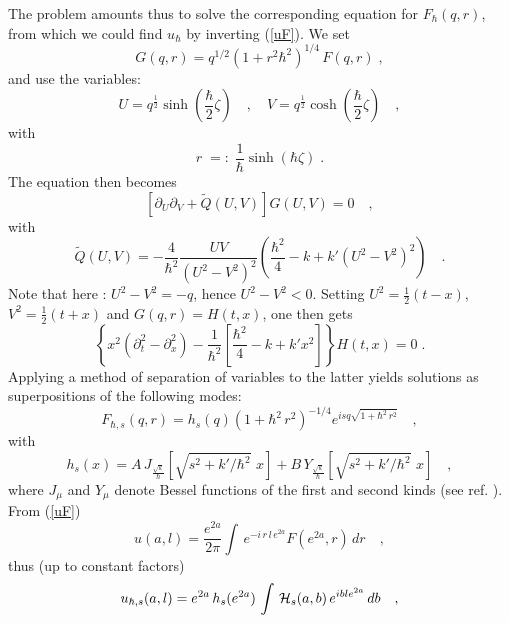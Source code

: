 \documentclass{article}
\def\m{\mu}
\begin{document}
\noindent The problem  amounts thus to solve the corresponding equation for $F_\hbar (q,
r)$, from which we could find $u_\hbar$ by
inverting (\ref{uF}). We set 
\begin{equation}
G(q,r)  = q^{1/2} (1+ r^2\hbar^2)^{1/4}\,F(q,r)\;,
\end{equation}
\noindent and use the variables:
\begin{equation}\label{UVqr}
U = q^{\frac{1}{2}}\sinh(\frac{\hbar}{2}\zeta) \quad, \quad V =
q^{\frac{1}{2}}\cosh(\frac{\hbar}{2}\zeta)  \quad,
\end{equation}
with
\begin{equation}\label{rzeta}
r\;=:\;\frac{1}{\hbar}\sinh(\hbar\zeta)\;.
\end{equation}
\noindent The equation then becomes
\begin{equation}\label{wave}
\left[\partial_U \partial_V + \tilde{Q}(U,V)\right] G(U,V) = 0
\quad,
\end{equation}
with
\begin{equation}
\tilde{Q}(U,V) = -\frac{4}{\hbar^2} \frac{UV}{(U^2 - V^2)^2}
(\frac{\hbar^2}{4} - k + k'(U^2 - V^2)^2) \quad.
\end{equation}
Note that here : $U^2 - V^2 = -q$, hence $U^2 - V^2<0$. Setting  $U^2=\frac{1}{2}(t-x)$,
$V^2=\frac{1}{2}(t+x)$ and $G(q,r)=H(t,x)$, one then gets
\begin{equation}
\left\{x^2(\partial^2_t-\partial^2_x)-\frac
1{\hbar^2}[\frac{\hbar^2}{4} -k+k'x^2]\right\}H(t,x)=0\;.
\end{equation}
Applying a method of separation of variables to the latter yields solutions  as  superpositions of 
the following modes:
\begin{equation}
F_{\hbar,s} (q,r) =  h_s(q) (1+\hbar^2
\, r^2)^{-1/4} e^{i s q\sqrt{1+\hbar^2\,r^2} }\quad,
\end{equation}
with
\begin{equation}\label{hs}
h_s(x)= A\, J_{\frac
{\sqrt{k}}{\hbar}}[\sqrt{s^2+ {k'} /{\hbar^2}}\,\,
x] + B\, Y_{\frac{\sqrt{k}}{\hbar}}[\sqrt{s^2+  {k'}/ {\hbar^2}}\,\, x]\quad,
\end{equation}
where $J_\m$ and $Y_\mu$ denote  Bessel functions of the first and second kinds (see ref. \cite{Wa}).
From (\ref{uF})
\begin{equation}\label{Ftou}
u(a,l) = \frac{e^{2a}}{2 \pi}\int\, e^{-i \,r\, l\, e^{2a}} F(
e^{2a},r) \, dr \quad,
\end{equation}
thus (up to constant factors)
\begin{equation}\label{uGen}
u_{\hbar,s}(a,l) =  e^{2a} \, h_s(  e^{2a})\, \int \, {\cal
H}_s(a,b) \, e^{i  b  l e^{2a}} \, db \quad,
\end{equation}
\end{document}
